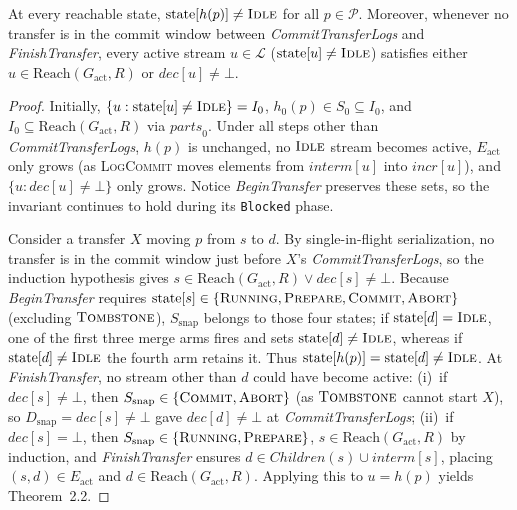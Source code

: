 \documentclass[sigconf,nonacm]{acmart}
\newcommand{\stIdle}{\textsc{Idle}}
\newcommand{\stRun}{\textsc{Running}}
\newcommand{\stPrep}{\textsc{Prepare}}
\newcommand{\stCom}{\textsc{Commit}}
\newcommand{\stAbt}{\textsc{Abort}}
\newcommand{\stTomb}{\textsc{Tombstone}}
\newcommand{\Children}{\mathit{Children}}
\newcommand{\parts}{\mathit{parts}}
\newcommand{\incr}{\mathit{incr}}
\newcommand{\interm}{\mathit{interm}}
\newcommand{\dec}{\mathit{dec}}
\begin{document}
\begin{lemma}\label{lem:coverage}
At every reachable state, \(\mathrm{state}[h(p)] \neq \stIdle\) for all
\(p \in \mathcal{P}\). Moreover, whenever no transfer is in the commit
window between \emph{CommitTransferLogs} and \emph{FinishTransfer}, every
active stream \(u \in \mathcal{L}\) (\(\mathrm{state}[u] \neq \stIdle\))
satisfies either \(u \in \mathrm{Reach}(G_{\mathrm{act}}, R)\) or
\(\dec[u] \neq \bot\).
\end{lemma}

\begin{proof}
Initially, \(\{u : \mathrm{state}[u] \neq \stIdle\} = I_0\), \(h_0(p) \in
S_0 \subseteq I_0\), and \(I_0 \subseteq \mathrm{Reach}(G_{\mathrm{act}},
R)\) via \(\parts_0\). Under all steps other than \emph{CommitTransferLogs},
\(h(p)\) is unchanged, no \(\stIdle\) stream becomes active,
\(E_{\mathrm{act}}\) only grows (as \textsc{LogCommit} moves elements from
\(\interm[u]\) into \(\incr[u]\)), and \(\{u : \dec[u] \neq \bot\}\) only
grows. Notice \emph{BeginTransfer} preserves these sets, so the invariant
continues to hold during its \texttt{Blocked} phase.

Consider a transfer \(X\) moving \(p\) from \(s\) to \(d\). By
single-in-flight serialization, no transfer is in the commit window just
before \(X\)'s \emph{CommitTransferLogs}, so the induction hypothesis gives
\(s \in \mathrm{Reach}(G_{\mathrm{act}}, R) \lor \dec[s] \neq \bot\).
Because \emph{BeginTransfer} requires \(\mathrm{state}[s] \in
\{\stRun,\allowbreak \stPrep,\allowbreak \stCom,\allowbreak \stAbt\}\)
(excluding \(\stTomb\)), \(S_{\mathrm{snap}}\) belongs to those four states;
if \(\mathrm{state}[d] = \stIdle\), one of the first three merge arms fires
and sets \(\mathrm{state}[d] \neq \stIdle\), whereas if
\(\mathrm{state}[d] \neq \stIdle\) the fourth arm retains it. Thus
\(\mathrm{state}[h(p)] = \mathrm{state}[d] \neq \stIdle\). At
\emph{FinishTransfer}, no stream other than \(d\) could have become active:
(i)~if \(\dec[s] \neq \bot\), then \(S_{\mathrm{snap}} \in
\{\stCom,\allowbreak \stAbt\}\) (as \(\stTomb\) cannot start \(X\)), so
\(D_{\mathrm{snap}} = \dec[s] \neq \bot\) gave \(\dec[d] \neq \bot\) at
\emph{CommitTransferLogs};
(ii)~if \(\dec[s] = \bot\), then \(S_{\mathrm{snap}} \in
\{\stRun,\allowbreak \stPrep\}\), \(s \in \mathrm{Reach}(G_{\mathrm{act}},
R)\) by induction, and \emph{FinishTransfer} ensures \(d \in \Children(s)
\cup \interm[s]\), placing \((s, d) \in E_{\mathrm{act}}\) and \(d \in
\mathrm{Reach}(G_{\mathrm{act}}, R)\). Applying this to \(u = h(p)\) yields
Theorem~2.2.
\end{proof}
\end{document}
